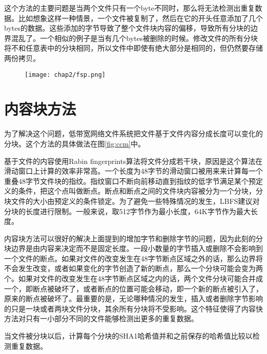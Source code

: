 这个方法的主要问题是当两个文件只有一个byte不同时，那么将无法检测出重复数据。比如想象这样一种情景，一个文件被复制了，然后在它的开头任意添加了几个bytes的数据。这些添加的字节导致了整个文件块内容的偏移，导致所有分块的边界混乱了。一个相似的例子是当有几个bytes被删除的时候。修改文件的所有分块将不和任意表中的分块相同，所以文件中即使有绝大部分是相同的，但仍然要存储两份拷贝。

\begin{figure}[!hbp]
    \begin{minipage}[b]{1\textwidth}
    \captionstyle{\centering}
    \centering
    \texttt{[image: chap2/fsp.png]}
    \end{minipage}     
\end{figure}

\section{内容块方法}
\label{sec:contentchunk}

为了解决这个问题，低带宽网络文件系统把文件基于文件内容分成长度可以变化的分块。这个方法的具体做法在图\ref{fig:ccm}中。

基于文件的内容使用Rabin fingerprints算法将文件分成若干块，原因是这个算法在滑动窗口上计算的效率非常高。一个长度为48字节的滑动窗口被用来来计算每一个重叠48字节文件块的指纹。指纹窗口不断向前移动直到指纹的低字节满足某个预定义的条件，把这个点叫做断点。断点和断点之间的文件块内容被分为一个分块，分块文件的大小由预定义的条件锁定。为了避免一些特殊情况的发生，LBFS建议对分块的长度进行限制。一般来说，取512字节作为最小长度，64K字节作为最大长度。

内容块方法可以很好的解决上面提到的增加字节和删除字节的问题，因为此刻的分块边界是由内容来决定而不是固定长度。一段小数量的字节插入或删除不会影响到一个文件的断点。如果对文件的改变发生在48字节断点区域之外的话，那么边界将不会发生改变，或者如果变化的字节创造了新的断点，那么一个分块可能会变为两个。如果对文件的改变发生在48字节断点区域之内的话，两个文件分块可能合并成一个，即断点被破坏了，或者断点的位置可能会移动，即一个新的断点被引入了，原来的断点被破坏了。最重要的是，无论哪种情况的发生，插入或者删除字节影响的只是一块或者两块文件分块，其余所有分块将不受影响。这个特征使得了内容快方法对只有一小部分不同的文件能够检测出更多的重复数据。

当文件被分块以后，计算每个分块的SHA1哈希值并和之前保存的哈希值比较以检测重复数据。


